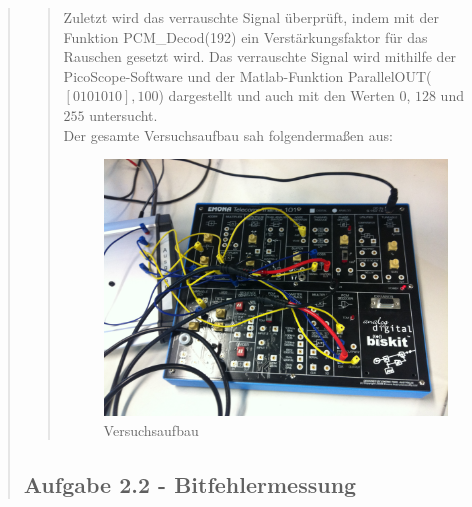 \begin{quote}
\begin{quote}
        Zuletzt wird das verrauschte Signal überprüft, indem mit der Funktion
        PCM\_Decod(192) ein Verstärkungsfaktor für das Rauschen gesetzt wird.
        Das verrauschte Signal wird mithilfe der PicoScope-Software und der
        Matlab-Funktion ParallelOUT($[0 1 0 1 0 1 0],100$) dargestellt und auch
        mit den Werten $0$, $128$ und $255$ untersucht.\\
        
        Der gesamte Versuchsaufbau sah folgendermaßen aus:
        
         \begin{figure}[H]
        \centering
            \includegraphics[scale=0.12, trim = 1.5cm 0cm 1.5cm 0cm,
            clip]{./Bilder/aufgabe1/Versuchsaufbau.JPG}
                \caption{Versuchsaufbau}
        \end{figure}
        
        
    \end{quote}%
    
    \subsection{Aufgabe 2.2 - Bitfehlermessung}
    \begin{quote}
    

\end{quote}
\end{quote}
